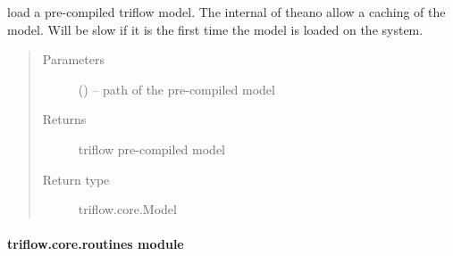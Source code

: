 \documentclass[letterpaper,10pt,english]{sphinxmanual}
\begin{document}
\begin{fulllineitems}
\label{\detokenize{triflow.core:triflow.core.model.load_model}}
load a pre-compiled triflow model. The internal of theano allow a
caching of the model. Will be slow if it is the first time the model is
loaded on the system.
\begin{quote}\begin{description}
\item[{Parameters}] \leavevmode
{} () -- path of the pre-compiled model

\item[{Returns}] \leavevmode
triflow pre-compiled model

\item[{Return type}] \leavevmode
triflow.core.Model

\end{description}\end{quote}

\end{fulllineitems}



\paragraph{triflow.core.routines module}
\label{\detokenize{triflow.core:triflow-core-routines-module}}\label{\detokenize{triflow.core:module-triflow.core.routines}}
\end{document}
